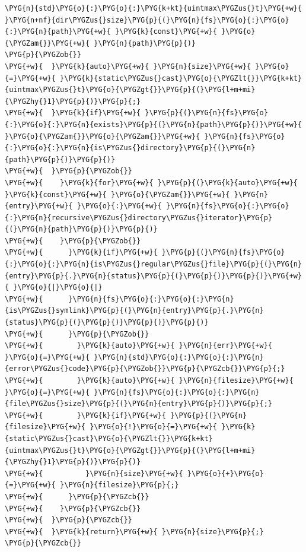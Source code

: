 \begin{codeblockbg}
\begin{Verbatim}[commandchars=\\\{\},breaklines=true,breakanywhere=true,fontsize=\codefont,xleftmargin=17bp]
\PYG{n}{std}\PYG{o}{:}\PYG{o}{:}\PYG{k+kt}{uintmax\PYGZus{}t}\PYG{+w}{ }\PYG{n+nf}{dir\PYGZus{}size}\PYG{p}{(}\PYG{n}{fs}\PYG{o}{:}\PYG{o}{:}\PYG{n}{path}\PYG{+w}{ }\PYG{k}{const}\PYG{+w}{ }\PYG{o}{\PYGZam{}}\PYG{+w}{ }\PYG{n}{path}\PYG{p}{)}
\PYG{p}{\PYGZob{}}
\PYG{+w}{  }\PYG{k}{auto}\PYG{+w}{ }\PYG{n}{size}\PYG{+w}{ }\PYG{o}{=}\PYG{+w}{ }\PYG{k}{static\PYGZus{}cast}\PYG{o}{\PYGZlt{}}\PYG{k+kt}{uintmax\PYGZus{}t}\PYG{o}{\PYGZgt{}}\PYG{p}{(}\PYG{l+m+mi}{\PYGZhy{}1}\PYG{p}{)}\PYG{p}{;}
\PYG{+w}{  }\PYG{k}{if}\PYG{+w}{ }\PYG{p}{(}\PYG{n}{fs}\PYG{o}{:}\PYG{o}{:}\PYG{n}{exists}\PYG{p}{(}\PYG{n}{path}\PYG{p}{)}\PYG{+w}{ }\PYG{o}{\PYGZam{}}\PYG{o}{\PYGZam{}}\PYG{+w}{ }\PYG{n}{fs}\PYG{o}{:}\PYG{o}{:}\PYG{n}{is\PYGZus{}directory}\PYG{p}{(}\PYG{n}{path}\PYG{p}{)}\PYG{p}{)}
\PYG{+w}{  }\PYG{p}{\PYGZob{}}
\PYG{+w}{    }\PYG{k}{for}\PYG{+w}{ }\PYG{p}{(}\PYG{k}{auto}\PYG{+w}{ }\PYG{k}{const}\PYG{+w}{ }\PYG{o}{\PYGZam{}}\PYG{+w}{ }\PYG{n}{entry}\PYG{+w}{ }\PYG{o}{:}\PYG{+w}{ }\PYG{n}{fs}\PYG{o}{:}\PYG{o}{:}\PYG{n}{recursive\PYGZus{}directory\PYGZus{}iterator}\PYG{p}{(}\PYG{n}{path}\PYG{p}{)}\PYG{p}{)}
\PYG{+w}{    }\PYG{p}{\PYGZob{}}
\PYG{+w}{      }\PYG{k}{if}\PYG{+w}{ }\PYG{p}{(}\PYG{n}{fs}\PYG{o}{:}\PYG{o}{:}\PYG{n}{is\PYGZus{}regular\PYGZus{}file}\PYG{p}{(}\PYG{n}{entry}\PYG{p}{.}\PYG{n}{status}\PYG{p}{(}\PYG{p}{)}\PYG{p}{)}\PYG{+w}{ }\PYG{o}{|}\PYG{o}{|}
\PYG{+w}{      }\PYG{n}{fs}\PYG{o}{:}\PYG{o}{:}\PYG{n}{is\PYGZus{}symlink}\PYG{p}{(}\PYG{n}{entry}\PYG{p}{.}\PYG{n}{status}\PYG{p}{(}\PYG{p}{)}\PYG{p}{)}\PYG{p}{)}
\PYG{+w}{      }\PYG{p}{\PYGZob{}}
\PYG{+w}{        }\PYG{k}{auto}\PYG{+w}{ }\PYG{n}{err}\PYG{+w}{ }\PYG{o}{=}\PYG{+w}{ }\PYG{n}{std}\PYG{o}{:}\PYG{o}{:}\PYG{n}{error\PYGZus{}code}\PYG{p}{\PYGZob{}}\PYG{p}{\PYGZcb{}}\PYG{p}{;}
\PYG{+w}{        }\PYG{k}{auto}\PYG{+w}{ }\PYG{n}{filesize}\PYG{+w}{ }\PYG{o}{=}\PYG{+w}{ }\PYG{n}{fs}\PYG{o}{:}\PYG{o}{:}\PYG{n}{file\PYGZus{}size}\PYG{p}{(}\PYG{n}{entry}\PYG{p}{)}\PYG{p}{;}
\PYG{+w}{        }\PYG{k}{if}\PYG{+w}{ }\PYG{p}{(}\PYG{n}{filesize}\PYG{+w}{ }\PYG{o}{!}\PYG{o}{=}\PYG{+w}{ }\PYG{k}{static\PYGZus{}cast}\PYG{o}{\PYGZlt{}}\PYG{k+kt}{uintmax\PYGZus{}t}\PYG{o}{\PYGZgt{}}\PYG{p}{(}\PYG{l+m+mi}{\PYGZhy{}1}\PYG{p}{)}\PYG{p}{)}
\PYG{+w}{          }\PYG{n}{size}\PYG{+w}{ }\PYG{o}{+}\PYG{o}{=}\PYG{+w}{ }\PYG{n}{filesize}\PYG{p}{;}
\PYG{+w}{      }\PYG{p}{\PYGZcb{}}
\PYG{+w}{    }\PYG{p}{\PYGZcb{}}
\PYG{+w}{  }\PYG{p}{\PYGZcb{}}
\PYG{+w}{  }\PYG{k}{return}\PYG{+w}{ }\PYG{n}{size}\PYG{p}{;}
\PYG{p}{\PYGZcb{}}
\end{Verbatim}
\end{codeblockbg}


